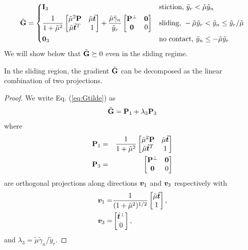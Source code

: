 \begin{equation}
	\sGtilde = 
	\begin{dcases}
		\mf{I}_3
		& \text{stiction, } \tilde{y}_r < \tilde{\mu} \tilde{y}_n\\
		\frac{1}{1+\tilde\mu^2}
		\begin{bmatrix}
			\tilde\mu^2\mf{P} & \tilde\mu\sthat\\
			\tilde\mu\sthat^T & 1
		\end{bmatrix} +
		\frac{\tilde\mu\tilde\gamma_n}{\tilde{y}_r}
		\begin{bmatrix}
			\mf{P}^\perp & \mf{0}\\
			\mf{0} & 0
		\end{bmatrix}
		& \text{sliding, } -\tilde\mu \tilde{y}_r < \tilde{y}_n \leq \tilde{y}_r/\tilde\mu\\
		\mf{0}_3 & \text{no contact, } \tilde{y}_n \leq -\tilde\mu\tilde{y}_r
	\end{dcases}
	\label{eq:Gtilde}
\end{equation}
We will show below that $\tilde{{\mathbf{G}}}\succeq 0$ even in the sliding regime.

\begin{lemma}
In the sliding region, the gradient $\tilde{{\mathbf{G}}}$ can be decomposed as the linear
combination of two projections.
\end{lemma}
\begin{proof}
We write Eq. (\ref{eq:Gtilde}) as
	\begin{equation}
		\tilde{{\mathbf{G}}} = {\mathbf{P}}_1 + \lambda_3 {\mathbf{P}}_3
	\end{equation}	
	where
	\begin{eqnarray}
		{\mathbf{P}}_1 &=& 
		\frac{1}{1+\tilde\mu^2}
			\begin{bmatrix}
				\tilde\mu^2{\mathbf{P}} & \tilde\mu\hat{{\bm{t}}}\\
				\tilde\mu\hat{{\bm{t}}}^T & 1 \end{bmatrix}\\
		{\mathbf{P}}_3 &=& 		
			\begin{bmatrix}
				{\mathbf{P}}^\perp & {\mathbf{0}}\\
				{\mathbf{0}} & 0
			\end{bmatrix}
	\end{eqnarray}
are orthogonal projections along directions ${\bm{v}}_1$ and ${\bm{v}}_3$
respectively with
\begin{eqnarray}
	{\bm{v}}_1 =& \frac{1}{(1+\tilde\mu^2)^{1/2}}
	\begin{bmatrix}
		\tilde\mu\hat{{\bm{t}}}\\
		1 \end{bmatrix},\\
	{\bm{v}}_3 =& 
	\begin{bmatrix}
		\hat{{\bm{t}}}^\perp\\
		0 \end{bmatrix},
\end{eqnarray}
and $\lambda_3 = \tilde\mu\tilde\gamma_n/\tilde{y}_r$.
\end{proof}
		
